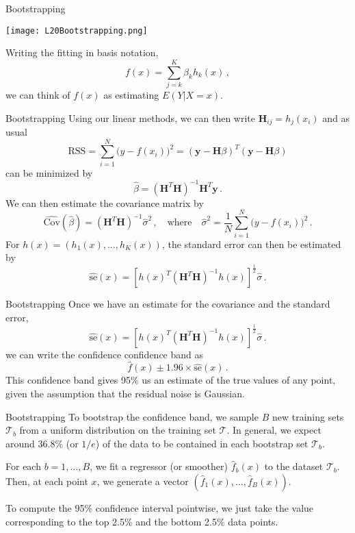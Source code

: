 \documentclass[10pt, table, dvipsnames,xcdraw, handout]{beamer}
\newcommand{\cT}{\ensuremath{\mathcal{T}}}
\newcommand{\bfy}{\ensuremath{\mathbf{y}}}
\begin{document}
\begin{frame}[fragile]{Bootstrapping}
  \begin{minipage}[t][0.5\textheight][t]{\textwidth}
	\centering \texttt{[image: L20Bootstrapping.png]} 
  \end{minipage}
  \vfill
\begin{minipage}[t][0.5\textheight][t]{\textwidth}
Writing the fitting in basis notation, 
$$
{f}(x) = \sum_{j=k}^K \beta_k h_k(x)\,,
$$
we can think of ${f}(x)$ as estimating $E(Y|X=x)$. 
\end{minipage}
\end{frame}


\begin{frame}[fragile]{Bootstrapping}
Using our linear methods, we can then write $\mathbf{H}_{ij} = h_{j}(x_i)$ and as usual
$$ 
\text{RSS} = \sum_{i=1}^N\big(y - {f}(x_i)\big)^2 = (\bfy - \mathbf{H}\beta)^T(\bfy - \mathbf{H}\beta)
$$
can be minimized by
$$
\hat{\beta} = (\mathbf{H}^T\mathbf{H})^{-1}\mathbf{H}^T\bfy\,.
$$\pause
We can then estimate the covariance matrix by 
$$
\hat{\text{Cov}}(\hat{\beta}) = (\mathbf{H}^T\mathbf{H})^{-1}\hat{\sigma}^2\,,\hspace{1em}\text{where}\hspace{1em} \hat{\sigma}^2  = \frac{1}{N} \sum_{i=1}^N\big(y - {f}(x_i)\big)^2\,.
$$\pause
For $h(x) = (h_1(x),\ldots, h_K(x))$, the standard error can then be estimated by
$$
\hat{\text{se}}(x) = [h(x)^T(\mathbf{H}^T\mathbf{H})^{-1}h(x)]^{\frac12}\hat{\sigma}\,.
$$
\end{frame}



\begin{frame}[fragile]{Bootstrapping}
Once we have an estimate for the covariance and the standard error,
$$
\hat{\text{se}}(x) = [h(x)^T(\mathbf{H}^T\mathbf{H})^{-1}h(x)]^{\frac12}\hat{\sigma}\,.
$$\pause 
we can write the confidence confidence band as
$$
\hat{f}(x) \pm 1.96\times\hat{\text{se}}(x)\,.
$$\pause
This confidence band gives 95\% us an estimate of the true values of any point, given the assumption that the residual noise is Gaussian. 
\end{frame}



\begin{frame}[fragile]{Bootstrapping}
To bootstrap the confidence band, we sample $B$ new training sets $\cT_b$ from a uniform distribution on the training set $\cT$. In general, we expect around 36.8\% (or $1/e$) of the data to be contained in each bootstrap set $\cT_b$.\pause

For each $b=1,\ldots, B$, we fit a regressor (or smoother) $\hat{f}_b(x)$ to the dataset $\cT_b$. Then, at each point $x$, we generate a vector $(\hat{f}_1(x),\ldots, \hat{f}_B(x))$. \pause 

To compute the 95\% confidence interval pointwise, we just take the value corresponding to the top 2.5\% and the bottom 2.5\% data points.
\end{frame}
\end{document}

